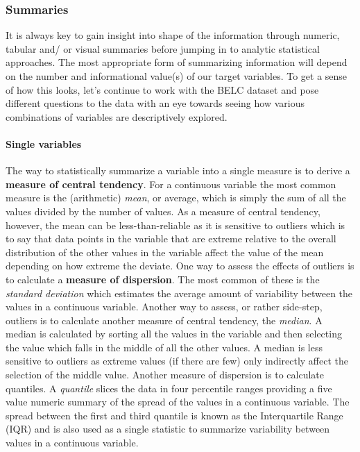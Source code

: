 \documentclass[
]{article}
\begin{document}
\hypertarget{summaries}{%
\subsubsection{Summaries}\label{summaries}}

It is always key to gain insight into shape of the information through numeric, tabular and/ or visual summaries before jumping in to analytic statistical approaches. The most appropriate form of summarizing information will depend on the number and informational value(s) of our target variables. To get a sense of how this looks, let's continue to work with the BELC dataset and pose different questions to the data with an eye towards seeing how various combinations of variables are descriptively explored.

\hypertarget{single-variables}{%
\paragraph{Single variables}\label{single-variables}}

The way to statistically summarize a variable into a single measure is to derive a \textbf{measure of central tendency}. For a continuous variable the most common measure is the (arithmetic) \emph{mean}, or average, which is simply the sum of all the values divided by the number of values. As a measure of central tendency, however, the mean can be less-than-reliable as it is sensitive to outliers which is to say that data points in the variable that are extreme relative to the overall distribution of the other values in the variable affect the value of the mean depending on how extreme the deviate. One way to assess the effects of outliers is to calculate a \textbf{measure of dispersion}. The most common of these is the \emph{standard deviation} which estimates the average amount of variability between the values in a continuous variable. Another way to assess, or rather side-step, outliers is to calculate another measure of central tendency, the \emph{median}. A median is calculated by sorting all the values in the variable and then selecting the value which falls in the middle of all the other values. A median is less sensitive to outliers as extreme values (if there are few) only indirectly affect the selection of the middle value. Another measure of dispersion is to calculate quantiles. A \emph{quantile} slices the data in four percentile ranges providing a five value numeric summary of the spread of the values in a continuous variable. The spread between the first and third quantile is known as the Interquartile Range (IQR) and is also used as a single statistic to summarize variability between values in a continuous variable.
\end{document}
